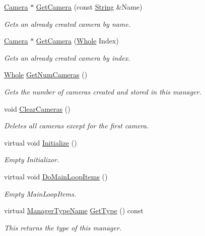 \begin{DoxyCompactItemize}
\hyperlink{classphys_1_1Camera}{Camera} $\ast$ \hyperlink{classphys_1_1CameraManager_ad247bd3789c579cba5edb4c00848ac7c}{GetCamera} (const \hyperlink{namespacephys_aa03900411993de7fbfec4789bc1d392e}{String} \&Name)
\begin{DoxyCompactList}\small\item\em Gets an already created camera by name. \item\end{DoxyCompactList}\item 
\hyperlink{classphys_1_1Camera}{Camera} $\ast$ \hyperlink{classphys_1_1CameraManager_a5147ab2269311bec15100953b7505d4b}{GetCamera} (\hyperlink{namespacephys_a460f6bc24c8dd347b05e0366ae34f34a}{Whole} Index)
\begin{DoxyCompactList}\small\item\em Gets an already created camera by index. \item\end{DoxyCompactList}\item 
\hyperlink{namespacephys_a460f6bc24c8dd347b05e0366ae34f34a}{Whole} \hyperlink{classphys_1_1CameraManager_a1a2111b4868bec403979b354395c4caf}{GetNumCameras} ()
\begin{DoxyCompactList}\small\item\em Gets the number of cameras created and stored in this manager. \item\end{DoxyCompactList}\item 
void \hyperlink{classphys_1_1CameraManager_a76bebee0820fcfa462412cb112b1b874}{ClearCameras} ()
\begin{DoxyCompactList}\small\item\em Deletes all cameras except for the first camera. \item\end{DoxyCompactList}\item 
virtual void \hyperlink{classphys_1_1CameraManager_a5e956b61fa341ae576d8d160da518488}{Initialize} ()
\begin{DoxyCompactList}\small\item\em Empty Initializor. \item\end{DoxyCompactList}\item 
virtual void \hyperlink{classphys_1_1CameraManager_aaae22266bccc43f6efa66d2735d7d1d3}{DoMainLoopItems} ()
\begin{DoxyCompactList}\small\item\em Empty MainLoopItems. \item\end{DoxyCompactList}\item 
virtual \hyperlink{classphys_1_1ManagerBase_aaa6ccddf23892eaccb898529414f80a5}{ManagerTypeName} \hyperlink{classphys_1_1CameraManager_a8412ea634307aa280b615a3cc7c9b739}{GetType} () const 
\begin{DoxyCompactList}\small\item\em This returns the type of this manager. \item\end{DoxyCompactList}\end{DoxyCompactItemize}
